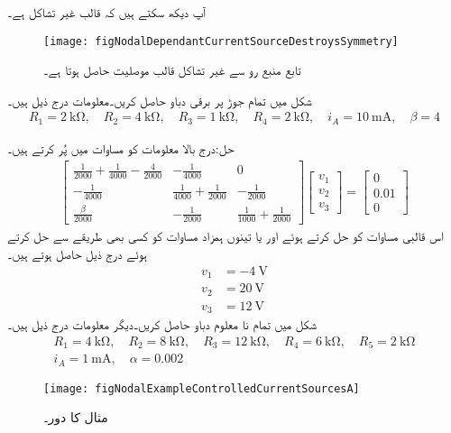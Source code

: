 آپ دیکھ سکتے ہیں کہ  قالب غیر تشاکل ہے۔
\begin{figure}
\centering
\texttt{[image: figNodalDependantCurrentSourceDestroysSymmetry]}
\caption{تابع منبع رو سے غیر تشاکل قالب موصلیت حاصل ہوتا ہے۔}
\label{شکل_جوڑ_تابع_منبع_رو_غیر_تشاکل_قالب}
\end{figure}
شکل  میں تمام جوڑ پر برقی دباو حاصل کریں۔معلومات درج ذیل ہیں۔
\begin{align*}
R_1=\SI{2}{\kilo\ohm}, \quad R_2=\SI{4}{\kilo\ohm}, \quad R_3=\SI{1}{\kilo\ohm}, \quad R_4=\SI{2}{\kilo\ohm}, \quad i_A=\SI{10}{\milli\ampere}, \quad \beta=4
\end{align*}

حل:درج بالا معلومات کو مساوات  میں پُر کرتے ہیں۔
\begin{align*}
\begin{bmatrix}
\frac{1}{2000}+\frac{1}{4000}-\frac{4}{2000}&-\frac{1}{4000}&0\\
-\frac{1}{4000}&\frac{1}{4000}+\frac{1}{2000}&-\frac{1}{2000}\\
\frac{\beta}{2000}& -\frac{1}{2000}&\frac{1}{1000}+\frac{1}{2000}
\end{bmatrix}
\begin{bmatrix}
v_1\\
v_2\\
v_3
\end{bmatrix}
=
\begin{bmatrix}
0\\
0.01\\
0
\end{bmatrix}
\end{align*}
اس قالبی مساوات کو حل کرتے ہوئے اور یا تینوں ہمزاد مساوات کو کسی بھی طریقے سے حل کرتے ہوئے  درج ذیل حاصل ہوتے ہیں۔
\begin{align*}
v_1&=\SI{-4}{\volt}\\
v_2&=\SI{20}{\volt}\\
v_3&=\SI{12}{\volt}
\end{align*}
شکل  میں تمام نا معلوم دباو حاصل کریں۔دیگر معلومات درج ذیل ہیں۔
\begin{align*}
R_1=\SI{4}{\kilo\ohm}, \quad R_2=\SI{8}{\kilo\ohm}, \quad R_3=\SI{12}{\kilo\ohm},\quad R_4=\SI{6}{\kilo\ohm},\quad R_5=\SI{2}{\kilo\ohm}\\
 i_A=\SI{1}{\milli\ampere},\quad \alpha=0.002
\end{align*}
\begin{figure}[!h]
\centering
\texttt{[image: figNodalExampleControlledCurrentSourcesA]}
\caption{مثال  کا دور۔}
\label{شکل_جوڑ_مثال_مزید}
\end{figure}

